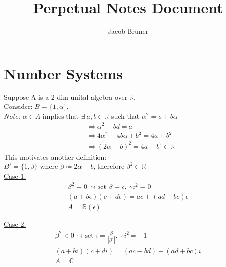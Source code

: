 \documentclass[11pt,a4paper]{article}
\author{Jacob Bruner}
\title{Perpetual Notes Document}
\newcommand{\reals}{\mathbb{R}}
\newcommand{\complexes}{\mathbb{C}}
\begin{document}
\maketitle
\tableofcontents
\pagebreak

\iffalse
############
heres an example of a code block
\begin{lstlisting}
        def intervalValues(z, n):
            return output # return the sequence of values
\end{lstlisting}

heres an example of an image
\begin{figure}[h]
\begin{center}
\texttt{[image: onefifteen]} 
\caption{Sequences Generated by n = 1-15 on Argand Diagram}
\end{center}
\end{figure}
############
\fi

\section{Number Systems}
Suppose A is a 2-dim unital algebra over $\reals$.  \\
Consider: $B = \{ 1,  \alpha \}$,   \\
\textit{Note:} $\alpha \in A$ implies that $ \exists\  a,b \in \reals$ such that $ \alpha^2 = a+b \alpha$
\begin{align*}
&\Rightarrow \alpha^2 -bd = a \\
&\Rightarrow 4\alpha^2 - 4b\alpha + b^2 = 4a+b^2\\
&\Rightarrow (2\alpha-b)^2 = 4a + b^2 \in \reals
\end{align*}
This motivates another definition: \\
$B' = \{ 1, \beta \}$ where $\beta \coloneq 2 \alpha - b$, therefore $\beta^2 \in \reals$ \\

\underline{Case 1:} \\
\begin{align*}
\beta^2 = 0 \rightsquigarrow \text{set } \beta = \epsilon, \ \therefore \epsilon^2 = 0 \\
(a+b\epsilon)(c+d\epsilon) = ac+(ad+bc)\epsilon \\
A = \reals(\epsilon)
\end{align*}

\underline{Case 2:} \\
\begin{align*}
\beta^2 < 0 \rightsquigarrow \text{set } i = \frac{\beta}{|\beta^2|}, \ \therefore i^2 = -1 \\
(a+bi)(c+di) = (ac-bd)+(ad+bc)i \\
A = \complexes
\end{align*}
\end{document}
